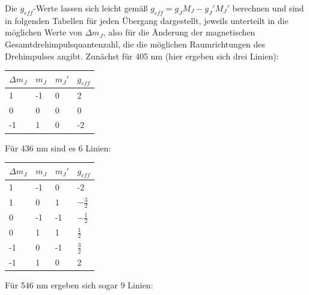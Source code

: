 \documentclass[bigchapter,colorback,accentcolor=tud4b,linedtoc,11pt]{tudreport}
\begin{document}
Die $g_{eff}$-Werte lassen sich leicht gemäß $g_{eff} = g_J M_J - g_J' M_J'$ berechnen und sind in folgenden Tabellen für jeden Übergang dargestellt, jeweils unterteilt in die möglichen Werte von $\Delta m_J$, also für die Änderung der magnetischen Gesamtdrehimpulsquantenzahl, die die möglichen Raumrichtungen des Drehimpulses angibt. Zunächst für 405 nm (hier ergeben sich drei Linien):

\begin{center}
  \begin{tabular}{|p{2cm}|p{2cm}|p{2cm}|p{2cm}|}
    \hline
    $\Delta m_J$ & $m_J$ & $m_J'$ & $g_{eff}$ \\ \hline
    1               & -1               & 0 & 2 \\ \hline
    0               & 0                & 0 & 0 \\ \hline
    -1              & 1                & 0 & -2 \\ \hline
	\end{tabular}
\end{center}

Für 436 nm sind es 6 Linien:

\begin{center}
  \begin{tabular}{|p{2cm}|p{2cm}|p{2cm}|p{2cm}|}
    \hline
    $\Delta m_J$ & $m_J$ & $m_J'$ & $g_{eff}$ \\ \hline
    1               & -1               & 0 & -2 \\ \hline
    1               & 0                & 1 & $-\frac{3}{2}$ \\ \hline
    0               & -1               & -1 & $-\frac{1}{2}$ \\ \hline
    0               & 1                & 1 & $\frac{1}{2}$ \\ \hline
   -1               & 0                & -1 & $\frac{3}{2}$ \\ \hline    
   -1               & 1                & 0 & 2 \\ \hline
    \end{tabular}
\end{center}

Für 546 nm ergeben sich sogar 9 Linien:
\end{document}
